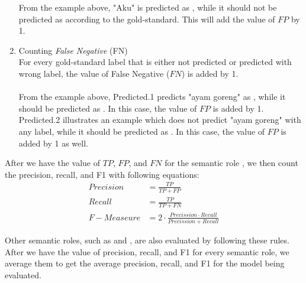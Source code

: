 \begin{enumerate}
	From the example above, "Aku" is predicted as \patient, while it should not be predicted as \patient according to the gold-standard. This will add the value of $FP$ by 1.
	\\
	
	\item Counting \textit{False Negative} (FN)\\
	For every gold-standard label that is either not predicted or predicted with wrong label, the value of False Negative ($FN$) is added by 1.
	\\
	
	\\
	
	From the example above, Predicted.1 predicts "ayam goreng" as \agent, while it should be predicted as \patient. In this case, the value of $FP$ is added by 1. Predicted.2 illustrates an example which does not predict "ayam goreng" with any label, while it should be predicted as \patient. In this case, the value of $FP$ is added by 1 as well.
	
\end{enumerate}

After we have the value of $TP$, $FP$, and $FN$ for the semantic role \patient, we then count the precision, recall, and F1 with following equations:
\begin{align}
Precision &= \frac{TP}{TP+FP}\\
Recall &= \frac{TP}{TP+FN}\\
F-Measeure &= 2 \cdot \frac{Precission \cdot Recall}{Precission + Recall}
\end{align}

Other semantic roles, such as \agent and \beneficiary, are also evaluated by following these rules. After we have the value of precision, recall, and F1 for every semantic role, we average them to get the average precision, recall, and F1 for the model being evaluated.
	